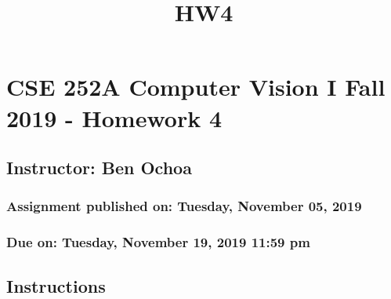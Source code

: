 \documentclass[11pt]{article}
\title{HW4}
\begin{document}
    
    \maketitle
    
    

    
    \hypertarget{cse-252a-computer-vision-i-fall-2019---homework-4}{%
\section{CSE 252A Computer Vision I Fall 2019 - Homework
4}\label{cse-252a-computer-vision-i-fall-2019---homework-4}}

\hypertarget{instructor-ben-ochoa}{%
\subsection{Instructor: Ben Ochoa}\label{instructor-ben-ochoa}}

\hypertarget{assignment-published-on-tuesday-november-05-2019}{%
\subsubsection{Assignment published on: Tuesday, November 05,
2019}\label{assignment-published-on-tuesday-november-05-2019}}

\hypertarget{due-on-tuesday-november-19-2019-1159-pm}{%
\subsubsection{Due on: Tuesday, November 19, 2019 11:59
pm}\label{due-on-tuesday-november-19-2019-1159-pm}}

\hypertarget{instructions}{%
\subsection{Instructions}\label{instructions}}
\end{document}
